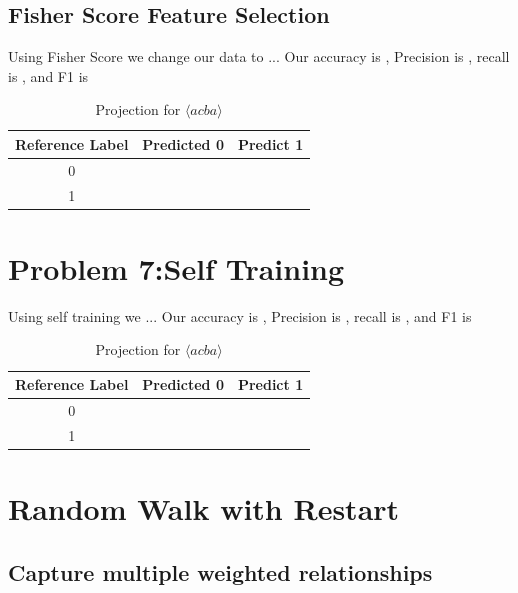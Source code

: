 \documentclass[11pt]{article}
\begin{document}
\subsection{Fisher Score Feature Selection}
Using Fisher Score we change our data to ...
Our accuracy is , Precision is , recall is , and F1 is 
\begin{table}[]
    \centering
    \begin{tabular}{|c|c|c|} \hline
       Reference Label  & Predicted 0 & Predict 1   \\ \hline
       0 & & \\ \hline
       1 & & \\ \hline
    \end{tabular}
    \caption{Projection for $\langle acba\rangle$}
    \label{tab:Accuracy}
\end{table}
\section{Problem 7:Self Training}
Using self training we ...
Our accuracy is , Precision is , recall is , and F1 is 
\begin{table}[]
    \centering
    \begin{tabular}{|c|c|c|} \hline
       Reference Label  & Predicted 0 & Predict 1   \\ \hline
       0 & & \\ \hline
       1 & & \\ \hline
    \end{tabular}
    \caption{Projection for $\langle acba\rangle$}
    \label{tab:Accuracy}
\end{table}
\section{Random Walk with Restart}
\subsection{Capture multiple weighted relationships}
\end{document}
